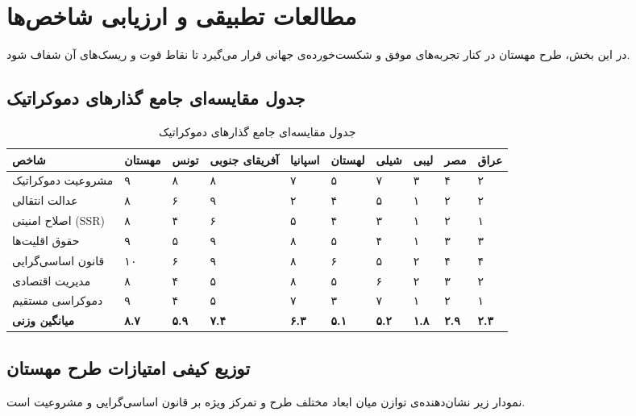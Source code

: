 \chapter{مطالعات تطبیقی و ارزیابی شاخص‌ها}
\label{app:comparison}

در این بخش، طرح مهستان در کنار تجربه‌های موفق و شکست‌خورده‌ی جهانی قرار می‌گیرد تا نقاط قوت و ریسک‌های آن شفاف شود.

\begin{landscape}
\section{جدول مقایسه‌ای جامع گذارهای دموکراتیک}

\begin{table}[htbp]
\centering
\caption{جدول مقایسه‌ای جامع گذارهای دموکراتیک}
\small
\begin{tabular}{R{2.2cm} C{1.1cm} C{1.1cm} C{1.1cm} C{1.1cm} C{1.1cm} C{1.1cm} C{1.1cm} C{1.1cm} C{1.1cm}}
\hline
\textbf{شاخص} & \textbf{مهستان} & \textbf{تونس} & \textbf{آفریقای جنوبی} & \textbf{اسپانیا} & \textbf{لهستان} & \textbf{شیلی} & \textbf{لیبی} & \textbf{مصر} & \textbf{عراق} \\
\hline
مشروعیت دموکراتیک & ۹ & ۸ & ۸ & ۷ & ۵ & ۷ & ۳ & ۴ & ۲ \\
عدالت انتقالی & ۸ & ۶ & ۹ & ۲ & ۴ & ۵ & ۱ & ۲ & ۲ \\
اصلاح امنیتی (SSR) & ۸ & ۴ & ۶ & ۵ & ۴ & ۳ & ۱ & ۲ & ۱ \\
حقوق اقلیت‌ها & ۹ & ۵ & ۹ & ۸ & ۵ & ۴ & ۱ & ۳ & ۳ \\
قانون اساسی‌گرایی & ۱۰ & ۶ & ۹ & ۸ & ۶ & ۵ & ۲ & ۴ & ۴ \\
مدیریت اقتصادی & ۸ & ۴ & ۵ & ۸ & ۵ & ۶ & ۲ & ۳ & ۲ \\
دموکراسی مستقیم & ۹ & ۴ & ۵ & ۷ & ۳ & ۷ & ۱ & ۲ & ۱ \\
\hline
\textbf{میانگین وزنی} & \textbf{۸.۷} & \textbf{۵.۹} & \textbf{۷.۴} & \textbf{۶.۳} & \textbf{۵.۱} & \textbf{۵.۲} & \textbf{۱.۸} & \textbf{۲.۹} & \textbf{۲.۳} \\
\hline
\end{tabular}
\end{table}
\end{landscape}

\section{توزیع کیفی امتیازات طرح مهستان}

نمودار زیر نشان‌دهنده‌ی توازن میان ابعاد مختلف طرح و تمرکز ویژه بر قانون اساسی‌گرایی و مشروعیت است.

